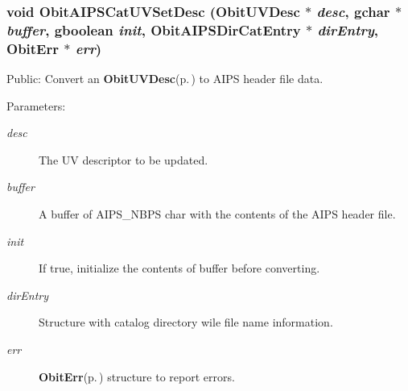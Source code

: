 \subsubsection{\setlength{\rightskip}{0pt plus 5cm}void Obit\-AIPSCat\-UVSet\-Desc ({\bf Obit\-UVDesc} $\ast$ {\em desc}, gchar $\ast$ {\em buffer}, gboolean {\em init}, {\bf Obit\-AIPSDir\-Cat\-Entry} $\ast$ {\em dir\-Entry}, {\bf Obit\-Err} $\ast$ {\em err})}\label{ObitAIPSCat_8h_a3}


Public: Convert an {\bf Obit\-UVDesc}{\rm (p.\,\pageref{structObitUVDesc})} to AIPS header file data. 

\begin{Desc}
\item[Parameters:]
\begin{description}
\item[{\em desc}]The UV descriptor to be updated. \item[{\em buffer}]A buffer of AIPS\_\-NBPS char with the contents of the AIPS header file. \item[{\em init}]If true, initialize the contents of buffer before converting. \item[{\em dir\-Entry}]Structure with catalog directory wile file name information. \item[{\em err}]{\bf Obit\-Err}{\rm (p.\,\pageref{structObitErr})} structure to report errors. \end{description}
\end{Desc}
